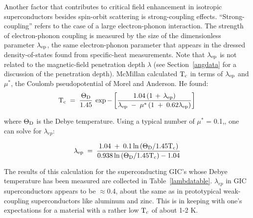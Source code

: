          Another factor that contributes  to  critical field enhancement in
isotropic superconductors besides  spin-orbit scattering is strong-coupling
effects.  ``Strong-coupling'' refers to the case of a large electron-phonon
interaction.  The strength of electron-phonon  coupling is measured  by the
size  of the   dimensionless   parameter  $\rm \lambda_{ep}$,    the   same
electron-phonon parameter that appears   in  the dressed  density-of-states
found from   specific-heat measurements.\cite{ashcroft76}  Note   that $\rm
\lambda_{ep}$ is not  related   to the magnetic-field   penetration   depth
$\lambda$ (see  Section~\ref{angdata} for  a  discussion of the penetration
depth).    McMillan\cite{mcmillan68} calculated    $\rm T_c$  in  terms  of
$\rm \lambda_{ep}$  and    $\mu ^*$,  the   Coulomb  pseudopotential  of  Morel  and
Anderson\cite{morel62}.  He found:\\

\[
\rm T_c \; = \; \frac{\Theta_D}{1.45} \: \exp{-\left[ \frac{1.04 \left( 1
\, + \, \lambda_{ep} \right)}{\lambda_{ep} \; - \; \mu^* \left(1 \; + \; 0.62\lambda_{ep} \right)}  \right]}
\]

\noindent where $\rm \Theta_D$ is the Debye temperature.   Using a typical
number of  $\mu^*$ = 0.1,\cite{mcmillan68},  one can solve for
$\lambda_{ep}$:

\begin{equation}
\label{mcmillan}
\rm \lambda_{ep} \; = \; \frac{1.04 \; + \; 0.1 \ln{\left( \Theta_D/1.45 T_c
\right)}}{0.938 \ln{\left( \Theta_D/1.45 T_c \right)} - 1.04}
\end{equation}

\noindent  The results of this calculation for the superconducting GIC's
whose    Debye   temperature    has   been   measured   are  collected   in
Table~\ref{lambdatable}.  $\lambda_{ep}$  in  GIC superconductors appears  to be
$\approx$0.4,     about   the    same   as   in  prototypical weak-coupling
superconductors like aluminum and zinc.\cite{mcmillan68} This is in keeping
with one's expectations for a material with a rather low $\rm T_c$ of about
1-2 K.

